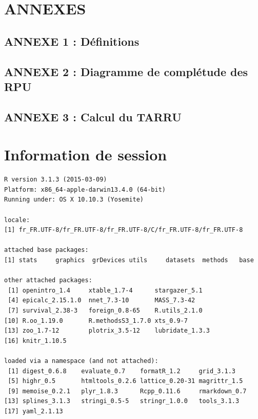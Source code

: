 \documentclass[]{article}
\begin{document}
\section{ANNEXES}\label{annexes}

\subsection{ANNEXE 1 : Définitions}\label{annexe-1-definitions}

\subsection{ANNEXE 2 : Diagramme de complétude des
RPU}\label{annexe-2-diagramme-de-completude-des-rpu}

\subsection{ANNEXE 3 : Calcul du TARRU}\label{annexe-3-calcul-du-tarru}

\section{Information de session}\label{information-de-session}

\begin{verbatim}
R version 3.1.3 (2015-03-09)
Platform: x86_64-apple-darwin13.4.0 (64-bit)
Running under: OS X 10.10.3 (Yosemite)

locale:
[1] fr_FR.UTF-8/fr_FR.UTF-8/fr_FR.UTF-8/C/fr_FR.UTF-8/fr_FR.UTF-8

attached base packages:
[1] stats     graphics  grDevices utils     datasets  methods   base     

other attached packages:
 [1] openintro_1.4     xtable_1.7-4      stargazer_5.1    
 [4] epicalc_2.15.1.0  nnet_7.3-10       MASS_7.3-42      
 [7] survival_2.38-3   foreign_0.8-65    R.utils_2.1.0    
[10] R.oo_1.19.0       R.methodsS3_1.7.0 xts_0.9-7        
[13] zoo_1.7-12        plotrix_3.5-12    lubridate_1.3.3  
[16] knitr_1.10.5     

loaded via a namespace (and not attached):
 [1] digest_0.6.8    evaluate_0.7    formatR_1.2     grid_3.1.3     
 [5] highr_0.5       htmltools_0.2.6 lattice_0.20-31 magrittr_1.5   
 [9] memoise_0.2.1   plyr_1.8.3      Rcpp_0.11.6     rmarkdown_0.7  
[13] splines_3.1.3   stringi_0.5-5   stringr_1.0.0   tools_3.1.3    
[17] yaml_2.1.13    
\end{verbatim}
\end{document}
